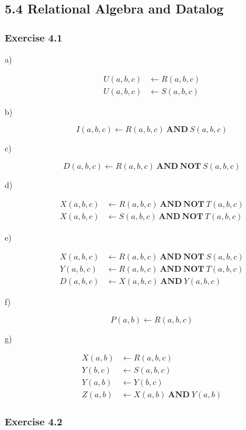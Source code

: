 \documentclass[../../main.tex]{subfiles}
\begin{document}
\subsection{5.4 Relational Algebra and Datalog}

\subsubsection*{Exercise 4.1}

a)

\begin{align*}
  U(a, b, c) &\leftarrow R(a, b, c) \\
  U(a, b, c) &\leftarrow S(a, b, c)
\end{align*}

b)

$$
I(a, b, c) \leftarrow R(a, b, c) \ \mathbf{AND} \ S(a, b, c)
$$

c)

$$
D(a, b , c) \leftarrow R(a, b, c) \ \mathbf{AND \ NOT} \ S(a, b, c)
$$

d)

\begin{align*}
  X(a, b, c) &\leftarrow R(a, b, c) \ \mathbf{AND \ NOT} \ T(a, b, c) \\
  X(a, b, c) &\leftarrow S(a, b, c) \ \mathbf{AND \ NOT} \ T(a, b, c)
\end{align*}

e)

\begin{align*}
  X(a, b, c) &\leftarrow R(a, b, c) \ \mathbf{AND \ NOT} \ S(a, b, c) \\
  Y(a, b, c) &\leftarrow R(a, b, c) \ \mathbf{AND \ NOT} \ T(a, b, c) \\
  D(a, b, c) &\leftarrow X(a, b, c) \ \mathbf{AND} \ Y(a, b, c)
\end{align*}

f)

$$
P(a, b) \leftarrow R(a, b, c)
$$

g)

\begin{align*}
  X(a, b) &\leftarrow R(a, b, c)\\
  Y(b, c) &\leftarrow S(a, b, c) \\
  Y(a, b) &\leftarrow Y(b, c) \\
  Z(a, b) &\leftarrow X(a, b) \ \mathbf{AND} \ Y(a, b)
\end{align*}

\subsubsection*{Exercise 4.2}
\end{document}
